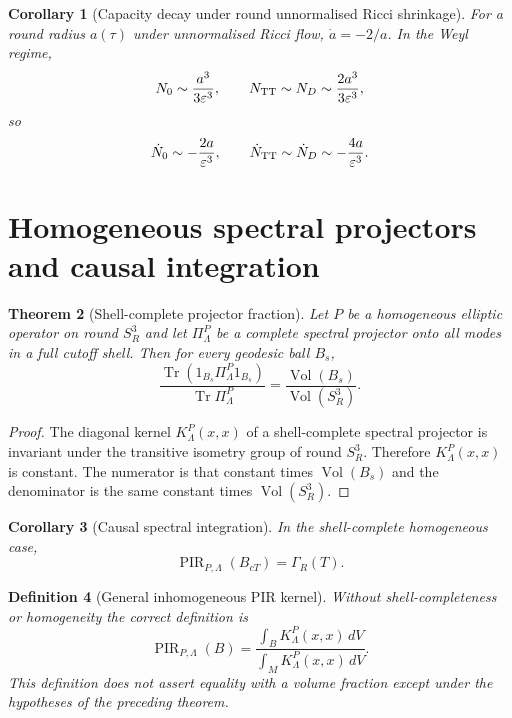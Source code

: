 \documentclass[11pt,a4paper]{article}
\newtheorem{theorem}{Theorem}[section]
\newtheorem{corollary}[theorem]{Corollary}
\newtheorem{definition}[theorem]{Definition}
\newcommand{\Vol}{\operatorname{Vol}}
\newcommand{\Tr}{\operatorname{Tr}}
\newcommand{\PIR}{\operatorname{PIR}}
\begin{document}
\begin{corollary}[Capacity decay under round unnormalised Ricci shrinkage]
For a round radius $a(\tau)$ under unnormalised Ricci flow, $\dot a=-2/a$.  In the Weyl regime,
\[
N_0\sim\frac{a^3}{3\varepsilon^3},\qquad
N_{\rm TT}\sim N_D\sim\frac{2a^3}{3\varepsilon^3},
\]
so
\[
\dot N_0\sim-\frac{2a}{\varepsilon^3},
\qquad
\dot N_{\rm TT}\sim\dot N_D\sim-\frac{4a}{\varepsilon^3}.
\]
\end{corollary}

\section{Homogeneous spectral projectors and causal integration}

\begin{theorem}[Shell-complete projector fraction]
Let $P$ be a homogeneous elliptic operator on round $S^3_R$ and let $\Pi^P_\Lambda$ be a complete spectral projector onto all modes in a full cutoff shell.  Then for every geodesic ball $B_s$,
\[
\frac{\Tr(1_{B_s}\Pi^P_\Lambda1_{B_s})}{\Tr\Pi^P_\Lambda}
=
\frac{\Vol(B_s)}{\Vol(S^3_R)}.
\]
\end{theorem}
\begin{proof}
The diagonal kernel $K_\Lambda^P(x,x)$ of a shell-complete spectral projector is invariant under the transitive isometry group of round $S^3_R$.  Therefore $K_\Lambda^P(x,x)$ is constant.  The numerator is that constant times $\Vol(B_s)$ and the denominator is the same constant times $\Vol(S^3_R)$.\end{proof}

\begin{corollary}[Causal spectral integration]
In the shell-complete homogeneous case,
\[
\PIR_{P,\Lambda}(B_{cT})=\Gamma_R(T).
\]
\end{corollary}

\begin{definition}[General inhomogeneous PIR kernel]
Without shell-completeness or homogeneity the correct definition is
\[
\PIR_{P,\Lambda}(B)=
\frac{\int_B K^P_\Lambda(x,x)\,dV}{\int_M K^P_\Lambda(x,x)\,dV}.
\]
This definition does not assert equality with a volume fraction except under the hypotheses of the preceding theorem.
\end{definition}
\end{document}
